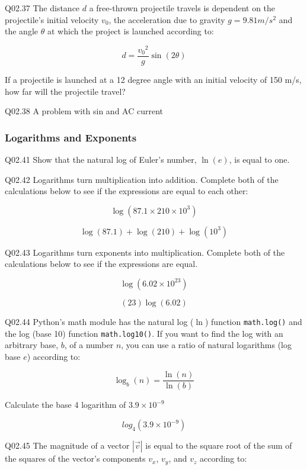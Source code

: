 \documentclass{book}
\newenvironment{problems}{}{}  %
\begin{document}
\begin{problems}
Q02.37 The distance \(d\) a free-thrown projectile travels is dependent
on the projectile's initial velocity \(v_0\), the acceleration due to
gravity \(g=9.81 m/s^2\) and the angle \(\theta\) at which the project
is launched according to:

\[ d = \frac{{v_0}^2}{g} \sin(2\theta) \]

If a projectile is launched at a 12 degree angle with an initial
velocity of 150 m/s, how far will the projectile travel?

Q02.38 A problem with sin and AC current
        \end{problems}

    




    
        \begin{problems}
        \subsubsection{Logarithms and Exponents}\label{logarithms-and-exponents}

Q02.41 Show that the natural log of Euler's number, \(\ln(e)\), is equal
to one.

Q02.42 Logarithms turn multiplication into addition. Complete both of
the calculations below to see if the expressions are equal to each
other:

\[ \log(87.1 \times 210 \times 10^{3}) \]

\[ \log(87.1) + \log(210) + \log(10^{3}) \]

Q02.43 Logarithms turn exponents into multiplication. Complete both of
the calculations below to see if the expressions are equal.

\[ \log(6.02 \times 10^{23}) \]

\[ (23)\log(6.02) \]

Q02.44 Python's math module has the natural log (\(\ln\)) function
\lstinline!math.log()! and the log (base 10) function
\lstinline!math.log10()!. If you want to find the log with an arbitrary
base, \(b\), of a number \(n\), you can use a ratio of natural
logarithms (log base \(e\)) according to:

\[ \log_b(n) = \frac{\ln(n)}{\ln(b)} \]

Calculate the base 4 logarithm of \(3.9 \times 10^{-9}\)

\[ log_{4}(3.9 \times 10^{-9}) \]

Q02.45 The magnitude of a vector \(|\vec{v}|\) is equal to the square
root of the sum of the squares of the vector's components \(v_x\),
\(v_y\), and \(v_z\) according to:


\end{problems}
\end{document}

